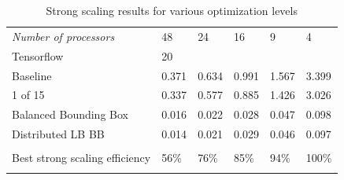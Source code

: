 \documentclass[11pt,letterpaper]{article}
\begin{document}
\begin{table}[!hbt]
\begin{tabular}{llllll}
  \textit{Number of processors}                       & 48       & 24       & 16      & 9       & 4        \\ \cline{2-6}
  \multicolumn{1}{l|}{Tensorflow}                     & 20       &          &         &         &          \\
  \multicolumn{1}{l|}{Baseline}                       & 0.371    & 0.634    & 0.991   & 1.567   & 3.399    \\
  \multicolumn{1}{l|}{1 of 15}                        & 0.337    & 0.577    & 0.885   & 1.426   & 3.026    \\
  \multicolumn{1}{l|}{Balanced Bounding Box}                    & 0.016    & 0.022    & 0.028   & 0.047   & 0.098    \\
  \multicolumn{1}{l|}{Distributed LB BB}                        & 0.014    & 0.021    & 0.029   & 0.046   & 0.097    \\
  \multicolumn{1}{l|}{}                               &          &          &         &         &          \\
  \multicolumn{1}{l|}{Best strong scaling efficiency} & 56\%     & 76\%     & 85\%    & 94\%    & 100\%    \\
                                                      &          &          &         &         &
  \end{tabular}
  \caption{Strong scaling results for various optimization levels}
  \label{tab:strongscaling}

\end{table}
\end{document}
